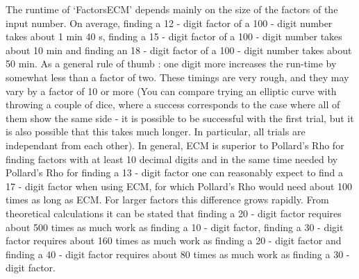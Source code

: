 The runtime of `FactorsECM' depends mainly on the size of the factors
of the input number.
On average, finding a 12 - digit factor of a 100 - digit number
takes about 1 min 40 s, finding a 15 - digit factor of a 100 - digit
number takes about 10 min and finding an 18 - digit factor of a 100 -
digit number takes about 50 min.
As a general rule of thumb : one digit more increases the run-time
by somewhat less than a factor of two.
These timings are very rough, and they may vary by a factor of 10 or more
(You can compare trying an elliptic curve with throwing a couple of dice,
where a success corresponds to the case where all of them show the same
side - it is possible to be successful with the first trial, but it is
also possible that this takes much longer. In particular, all trials are
independant from each other).
In general, ECM is superior to Pollard's Rho for finding factors with at
least 10 decimal digits and in the same time needed by Pollard's Rho for
finding a 13 - digit factor one can reasonably expect to find a
17 - digit factor when using ECM, for which Pollard's Rho would need 
about 100 times as long as ECM. For larger factors this difference
grows rapidly.
From theoretical calculations it can be stated that finding a
20 - digit factor requires about 500 times as much work as finding a
10 - digit factor, finding a 30 - digit factor requires about 160 times
as much work as finding a 20 - digit factor and finding a 40 - digit
factor requires about 80 times as much work as finding a 30 - digit
factor.

